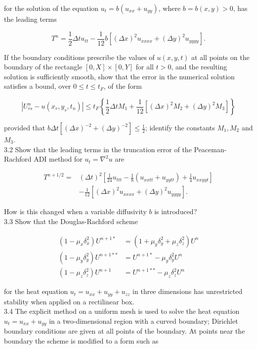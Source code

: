 \documentclass[10pt]{article}
\begin{document}
for the solution of the equation \(u_{t}=b\left(u_{x x}+u_{y y}\right)\), where \(b= b(x, y)>0\), has the leading terms

\[
T^{n}=\frac{1}{2} \Delta t u_{t t}-\frac{1}{12} b\left[(\Delta x)^{2} u_{x x x x}+(\Delta y)^{2} u_{y y y y}\right] .
\]

If the boundary conditions prescribe the values of \(u(x, y, t)\) at all points on the boundary of the rectangle \([0, X] \times[0, Y]\) for all \(t>0\), and the resulting solution is sufficiently smooth, show that the error in the numerical solution satisfies a bound, over \(0 \leq t \leq t_{F}\), of the form

\[
\left|U_{r s}^{n}-u\left(x_{r}, y_{s}, t_{n}\right)\right| \leq t_{F}\left\{\frac{1}{2} \Delta t M_{1}+\frac{1}{12}\left[(\Delta x)^{2} M_{2}+(\Delta y)^{2} M_{3}\right]\right\}
\]

provided that \(b \Delta t\left[(\Delta x)^{-2}+(\Delta y)^{-2}\right] \leq \frac{1}{2}\); identify the constants \(M_{1}, M_{2}\) and \(M_{3}\).\\
3.2 Show that the leading terms in the truncation error of the Peaceman-Rachford ADI method for \(u_{t}=\nabla^{2} u\) are

\[
\begin{aligned}
T^{n+1 / 2}= & (\Delta t)^{2}\left[\frac{1}{24} u_{t t t}-\frac{1}{8}\left(u_{x x t t}+u_{y y t t}\right)+\frac{1}{4} u_{x x y y t}\right] \\
& -\frac{1}{12}\left[(\Delta x)^{2} u_{x x x x}+(\Delta y)^{2} u_{y y y y}\right] .
\end{aligned}
\]

How is this changed when a variable diffusivity \(b\) is introduced?\\
3.3 Show that the Douglas-Rachford scheme

\[
\begin{aligned}
\left(1-\mu_{x} \delta_{x}^{2}\right) U^{n+1 *} & =\left(1+\mu_{y} \delta_{y}^{2}+\mu_{z} \delta_{z}^{2}\right) U^{n} \\
\left(1-\mu_{y} \delta_{y}^{2}\right) U^{n+1 * *} & =U^{n+1 *}-\mu_{y} \delta_{y}^{2} U^{n} \\
\left(1-\mu_{z} \delta_{z}^{2}\right) U^{n+1} & =U^{n+1 * *}-\mu_{z} \delta_{z}^{2} U^{n}
\end{aligned}
\]

for the heat equation \(u_{t}=u_{x x}+u_{y y}+u_{z z}\) in three dimensions has unrestricted stability when applied on a rectilinear box.\\
3.4 The explicit method on a uniform mesh is used to solve the heat equation \(u_{t}=u_{x x}+u_{y y}\) in a two-dimensional region with a curved boundary; Dirichlet boundary conditions are given at all points of the boundary. At points near the boundary the scheme is modified to a form such as
\end{document}
